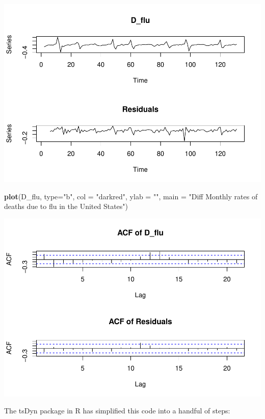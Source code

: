 \documentclass[
]{book}
\newenvironment{Shaded}{\begin{snugshade}}{\end{snugshade}}
\newcommand{\AttributeTok}[1]{\textcolor[rgb]{0.13,0.29,0.53}{#1}}
\newcommand{\FunctionTok}[1]{\textcolor[rgb]{0.13,0.29,0.53}{\textbf{#1}}}
\newcommand{\NormalTok}[1]{#1}
\newcommand{\StringTok}[1]{\textcolor[rgb]{0.31,0.60,0.02}{#1}}
\begin{document}
\includegraphics{Notas-Series-Tiempo_files/figure-latex/unnamed-chunk-65-1.pdf}

\begin{Shaded}
\begin{Highlighting}[]
\FunctionTok{plot}\NormalTok{(D\_flu, }\AttributeTok{type=}\StringTok{"b"}\NormalTok{, }\AttributeTok{col =} \StringTok{"darkred"}\NormalTok{, }\AttributeTok{ylab =} \StringTok{""}\NormalTok{, }
     \AttributeTok{main =} \StringTok{"Diff Monthly rates of deaths due to flu in the United States"}\NormalTok{)}
\end{Highlighting}
\end{Shaded}

\includegraphics{Notas-Series-Tiempo_files/figure-latex/unnamed-chunk-65-2.pdf}

The tsDyn package in R has simplified this code into a handful of steps:
\end{document}
